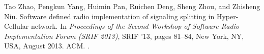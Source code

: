 \documentclass[a4paper]{article}
\begin{document}
\begin{thebibliography}{1}

Tao Zhao, Pengkun Yang, Huimin Pan, Ruichen Deng, Sheng Zhou, and Zhisheng Niu.
\newblock Software defined radio implementation of signaling splitting in
  {Hyper-Cellular} network.
\newblock In {\em Proceedings of the Second Workshop of Software Radio
  Implementation Forum (SRIF 2013)}, SRIF '13, pages 81--84, New York, NY, USA,
  August 2013. ACM.
\newblock \href {http://dx.doi.org/10.1145/2491246.2491258}
  {}.

\end{thebibliography}
\end{document}
